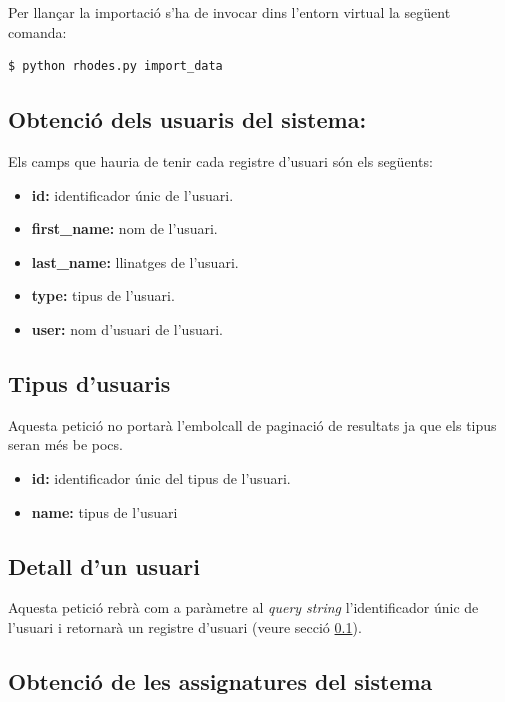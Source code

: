Per llançar la importació s'ha de invocar dins l'entorn virtual la següent comanda:

\begin{verbatim}
$ python rhodes.py import_data
\end{verbatim}
	

\subsection{Obtenció dels usuaris del sistema:} \label{retrieve_users}

	Els camps que hauria de tenir cada registre d'usuari són els següents:
	
	\begin{itemize}
		
		\item \textbf{id:} identificador únic de l'usuari.
		\item \textbf{first\_name:} nom de l'usuari.
		\item \textbf{last\_name:} llinatges de l'usuari.
		\item \textbf{type:} tipus de l'usuari.
		\item \textbf{user:} nom d'usuari de l'usuari.
	\end{itemize}

\subsection{Tipus d'usuaris}
	
	Aquesta petició no portarà l'embolcall de paginació de resultats ja que els tipus seran més be pocs.
	
	\begin{itemize}
		\item \textbf{id:} identificador únic del tipus de l'usuari.
		\item \textbf{name:} tipus de l'usuari
	\end{itemize}

\subsection{Detall d'un usuari}

	Aquesta petició rebrà com a paràmetre al \emph{query string} l'identificador únic de l'usuari i retornarà un registre d'usuari (veure secció \ref{retrieve_users}).
	
\subsection{Obtenció de les assignatures del sistema}

